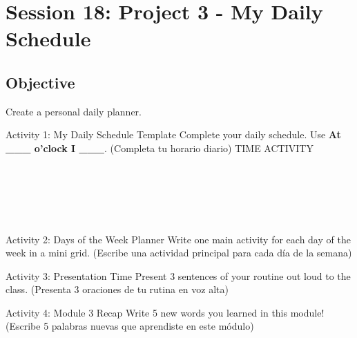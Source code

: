 \section*{Session 18: Project 3 - My Daily Schedule}

\subsection*{Objective}
Create a personal daily planner.

\begin{activity}{Activity 1: My Daily Schedule Template}
  Complete your daily schedule. Use \textbf{At \_\_\_ o'clock I \_\_\_}. (Completa tu horario diario)
  \vspace{1em}
  TIME \hspace{4cm} ACTIVITY \\
  \answerline[2cm] \hspace{2cm} \answerline[5cm] \\
  \answerline[2cm] \hspace{2cm} \answerline[5cm] \\
  \answerline[2cm] \hspace{2cm} \answerline[5cm] \\
  \answerline[2cm] \hspace{2cm} \answerline[5cm] \\
  \answerline[2cm] \hspace{2cm} \answerline[5cm] \\
  \answerline[2cm] \hspace{2cm} \answerline[5cm]
\end{activity}

\begin{activity}{Activity 2: Days of the Week Planner}
  Write one main activity for each day of the week in a mini grid. (Escribe una actividad principal para cada día de la semana)
  \writinglines[7]
\end{activity}

\begin{activity}{Activity 3: Presentation Time}
  Present 3 sentences of your routine out loud to the class. (Presenta 3 oraciones de tu rutina en voz alta)
  \writinglines[3]
\end{activity}

\begin{activity}{Activity 4: Module 3 Recap}
  Write 5 new words you learned in this module! (Escribe 5 palabras nuevas que aprendiste en este módulo)
  \writinglines[5]
\end{activity}

